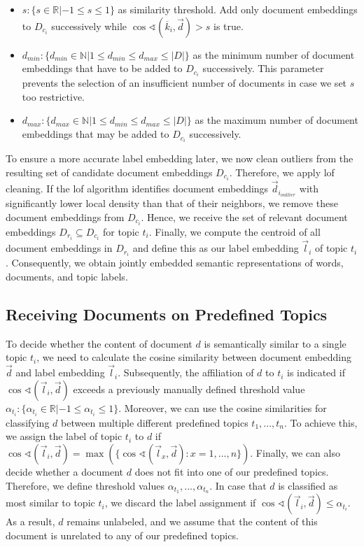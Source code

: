 \documentclass[a4paper,twoside]{article}
\begin{document}
\begin{itemize}[itemsep=2pt,parsep=2pt]
\item ${s:\{s\in\mathbb{R}|-1\leq s\leq1\}}$ as similarity threshold. Add only document embeddings to $D_{{c}_{i}}$ successively while ${\cos\sphericalangle(\overline{k}_{i},\vec{d})>s}$ is true.
    \item ${d_{min}:\{d_{min}\in\mathbb{N}|1\leq d_{min}\leq d_{max}\leq|D|\}}$ as the minimum number of document embeddings that have to be added to $D_{{c}_{i}}$ successively. This parameter prevents the selection of an insufficient number of documents in case we set $s$ too restrictive.
    \item ${d_{max}:\{d_{max}\in\mathbb{N}|1\leq d_{min}\leq d_{max}\leq|D|\}}$ as the maximum number of document embeddings that may be added to $D_{{c}_{i}}$ successively.
\end{itemize}
To ensure a more accurate label embedding later, we now clean outliers from the resulting set of candidate document embeddings $D_{{c}_{i}}$. Therefore, we apply \ac{lof} \citep{breuning-etal-2000} cleaning. If the \ac{lof} algorithm identifies document embeddings $\vec{d}_{i_{outlier}}$ with significantly lower local density than that of their neighbors, we remove these document embeddings from $D_{{c}_{i}}$. Hence, we receive the set of relevant document embeddings $D_{{r}_{i}} \subseteq D_{{c}_{i}}$ for topic $t_i$. Finally, we compute the centroid of all document embeddings in $D_{{r}_{i}}$ and define this as our label embedding $\vec{l}_i$ of topic $t_i$. Consequently, we obtain jointly embedded semantic representations of words, documents, and topic labels.

\subsection{Receiving Documents on Predefined Topics}

To decide whether the content of document $d$ is semantically similar to a single topic $t_i$, we need to calculate the cosine similarity between document embedding $\vec{d}$ and label embedding $\vec{l}_i$. Subsequently, the affiliation of $d$ to $t_i$ is indicated if $\cos\sphericalangle(\vec{l}_{i},\vec{d})$ exceeds a previously manually defined threshold value ${\alpha_{{t}_{i}}:\{\alpha_{{t}_{i}}\in\mathbb{R}|-1\leq\alpha_{{t}_{i}}\leq1\}}$. Moreover, we can use the cosine similarities for classifying $d$ between multiple different predefined topics ${t_1,...,t_n}$. To achieve this, we assign the label of topic $t_i$ to $d$ if ${\cos\sphericalangle(\vec{l}_{i},\vec{d})=\max(\{\cos\sphericalangle(\vec{l}_{x},\vec{d}):x=1,...,n\})}$. Finally, we can also decide whether a document $d$ does not fit into one of our predefined topics. Therefore, we define threshold values ${\alpha_{{t}_{1}},...,\alpha_{{t}_{n}}}$. In case that $d$ is classified as most similar to topic $t_i$, we discard the label assignment if ${\cos\sphericalangle(\vec{l}_{i},\vec{d})\leq\alpha_{{t}_{i}}}$. As a result, $d$ remains unlabeled, and we assume that the content of this document is unrelated to any of our predefined topics. 
\end{document}
